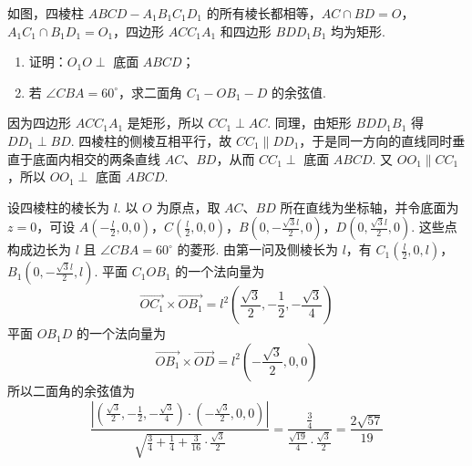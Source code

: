 \begin{problem}
如图，四棱柱 \(ABCD - A_{1}B_{1}C_{1}D_{1}\) 的所有棱长都相等，\(AC \cap BD = O\)，\(A_{1}C_{1} \cap B_{1}D_{1} = O_{1}\)，四边形 \(ACC_{1}A_{1}\) 和四边形 \(BDD_{1}B_{1}\) 均为矩形.

\begin{enumerate}
\item 证明：\(O_{1}O \perp\) 底面 \(ABCD\)；
\item 若 \(\angle CBA = 60^{\circ}\)，求二面角 \(C_{1} - OB_{1} - D\) 的余弦值.
\end{enumerate}


\begin{solution}
因为四边形 \(ACC_1A_1\) 是矩形，所以 \(CC_1\perp AC\). 同理，由矩形 \(BDD_1B_1\) 得 \(DD_1\perp BD\). 四棱柱的侧棱互相平行，故 \(CC_1\parallel DD_1\)，于是同一方向的直线同时垂直于底面内相交的两条直线 \(AC\)、\(BD\)，从而 \(CC_1\perp\) 底面 \(ABCD\). 又 \(OO_1\parallel CC_1\)，所以 \(OO_1\perp\) 底面 \(ABCD\).

设四棱柱的棱长为 \(l\). 以 \(O\) 为原点，取 \(AC\)、\(BD\) 所在直线为坐标轴，并令底面为 \(z=0\)，可设
\(A\left(-\frac l2,0,0\right)\)，\(C\left(\frac l2,0,0\right)\)，\(B\left(0,-\frac{\sqrt3l}{2},0\right)\)，\(D\left(0,\frac{\sqrt3l}{2},0\right)\).
这些点构成边长为 \(l\) 且 \(\angle CBA=60^{\circ}\) 的菱形. 由第一问及侧棱长为 \(l\)，有
\(C_1\left(\frac l2,0,l\right)\)，\(B_1\left(0,-\frac{\sqrt3l}{2},l\right)\).
平面 \(C_1OB_1\) 的一个法向量为
\[
\overrightarrow{OC_1}\times\overrightarrow{OB_1}
=l^2\left(\frac{\sqrt3}{2},-\frac12,-\frac{\sqrt3}{4}\right)
\]
平面 \(OB_1D\) 的一个法向量为
\[
\overrightarrow{OB_1}\times\overrightarrow{OD}
=l^2\left(-\frac{\sqrt3}{2},0,0\right)
\]
所以二面角的余弦值为
\[
\frac{\left|\left(\frac{\sqrt3}{2},-\frac12,-\frac{\sqrt3}{4}\right)\cdot\left(-\frac{\sqrt3}{2},0,0\right)\right|}
{\sqrt{\frac34+\frac14+\frac{3}{16}}\cdot\frac{\sqrt3}{2}}
=\frac{\frac34}{\frac{\sqrt{19}}4\cdot\frac{\sqrt3}{2}}
=\frac{2\sqrt{57}}{19}
\]
\end{solution}
\end{problem}

